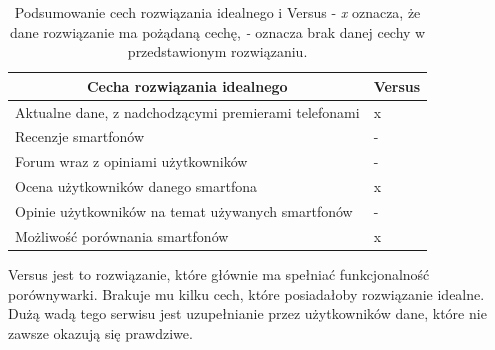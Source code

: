 \begin{table}[H]
    \centering
    \begin{tabular}{|l|l|}
        \hline
        \multicolumn{1}{|c|}{Cecha rozwiązania idealnego}    & \multicolumn{1}{c|}{Versus} \\ \hline
        Aktualne dane, z nadchodzącymi premierami telefonami & x                             \\ \hline
        Recenzje smartfonów                                  & -                                \\ \hline
        Forum wraz z opiniami użytkowników                   & -                                \\ \hline
        Ocena użytkowników danego smartfona                  & x                             \\ \hline
        Opinie użytkowników na temat używanych smartfonów    & -                                \\ \hline
        Możliwość porównania smartfonów                      & x                              \\ \hline
    \end{tabular}
    \caption{Podsumowanie cech rozwiązania idealnego i Versus - \textit{x} oznacza, że dane rozwiązanie ma pożądaną cechę, \textit{-} oznacza brak danej cechy w przedstawionym rozwiązaniu.}
    \label{comparison_versus}
\end{table}
Versus jest to rozwiązanie, które głównie ma spełniać funkcjonalność porównywarki. Brakuje mu kilku cech, które posiadałoby rozwiązanie idealne. Dużą wadą tego serwisu jest uzupełnianie przez użytkowników dane, które nie zawsze okazują się prawdziwe.
